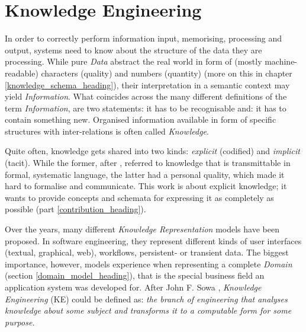 %
%
%
%
%
%
%

\section{Knowledge Engineering}
\label{knowledge_engineering_heading}

In order to correctly perform information input, memorising, processing and
output, systems need to know about the structure of the data they are
processing. While pure \emph{Data} abstract the real world in form of (mostly
machine-readable) characters (quality) and numbers (quantity) (more on this in
chapter \ref{knowledge_schema_heading}), their interpretation in a semantic
context may yield \emph{Information}. What coincides across the many different
definitions \cite{wikipedia} of the term \emph{Information}, are two
statements: it has to be recognisable and: it has to contain something new.
Organised information available in form of specific structures with
inter-relations is often called \emph{Knowledge}.

Quite often, knowledge gets shared into two kinds: \emph{explicit} (codified)
and \emph{implicit} (tacit). While the former, after \cite{nonaka}, referred to
knowledge that is transmittable in formal, systematic language, the latter had
a personal quality, which made it hard to formalise and communicate. This work
is about explicit knowledge; it wants to provide concepts and schemata for
expressing it as completely as possible (part \ref{contribution_heading}).

Over the years, many different \emph{Knowledge Representation} models have been
proposed. In software engineering, they represent different kinds of user
interfaces (textual, graphical, web), workflows, persistent- or transient data.
The biggest importance, however, models experience when representing a complete
\emph{Domain} (section \ref{domain_model_heading}), that is the special
business field an application system was developed for. After John F. Sowa
\cite{sowa}, \emph{Knowledge Engineering} (KE) could be defined as: \textit{the
branch of engineering that analyses knowledge about some subject and transforms
it to a computable form for some purpose.}

